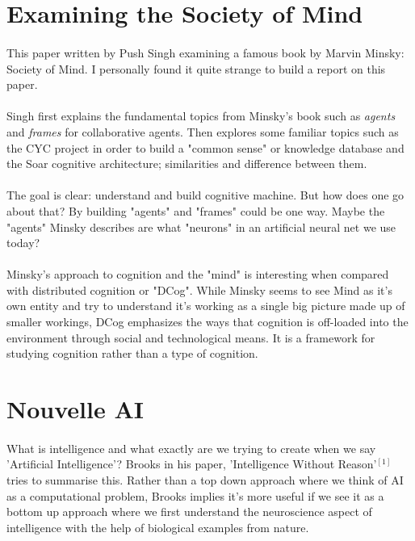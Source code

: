 \documentclass[10pt]{article}
\begin{document}
  \section{Examining the Society of Mind}
  \paragraph{} \indent
  This paper written by Push Singh examining a famous book by Marvin Minsky: Society of Mind. I personally found it quite strange to build a report on this paper.  
  \paragraph{}\indent
  Singh first explains the fundamental topics from Minsky's book such as \textit{agents} and \textit{frames} for collaborative agents. Then explores some familiar topics such as the CYC project in order to build a "common sense" or knowledge database and the Soar cognitive architecture; similarities and difference between them. 
  \paragraph{}\indent
  The goal is clear: understand and build cognitive machine. But how does one go about that? By building "agents" and "frames" could be one way. Maybe the "agents" Minsky describes are what "neurons" in an artificial neural net we use today?
  \paragraph{}\indent
  Minsky's approach to cognition and the "mind" is interesting when compared with distributed cognition or "DCog". While Minsky seems to see Mind as it's own entity and try to understand it's working as a single big picture made up of smaller workings, DCog emphasizes the ways that cognition is off-loaded into the environment through social and technological means. It is a framework for studying cognition rather than a type of cognition.
 
  \section{Nouvelle AI}
  \paragraph{} \indent
  What is intelligence and what exactly are we trying to create when we say 'Artificial Intelligence'? Brooks in his paper, 'Intelligence Without Reason'$^{[1]}$ tries to summarise this. Rather than a top down approach where we think of AI as a computational problem, Brooks implies it's more useful if we see it as a bottom up approach where we first understand the neuroscience aspect of intelligence with the help of biological examples from nature.
\end{document}
